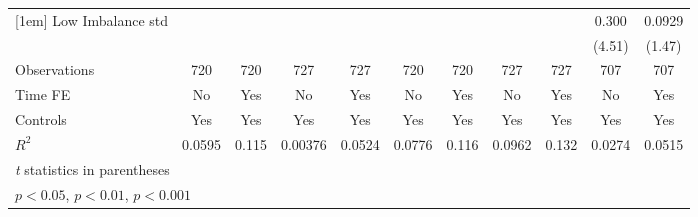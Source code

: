 {\begin{tabular}{l*{10}{c}}
[1em]
Low Imbalance std&                  &                  &                  &                  &                  &                  &                  &                  &    0.300\sym{***}&   0.0929         \\
                &                  &                  &                  &                  &                  &                  &                  &                  &   (4.51)         &   (1.47)         \\
\hline
Observations    &      720         &      720         &      727         &      727         &      720         &      720         &      727         &      727         &      707         &      707         \\
Time FE         &       No         &      Yes         &       No         &      Yes         &       No         &      Yes         &       No         &      Yes         &       No         &      Yes         \\
Controls        &      Yes         &      Yes         &      Yes         &      Yes         &      Yes         &      Yes         &      Yes         &      Yes         &      Yes         &      Yes         \\
$ R^2 $         &   0.0595         &    0.115         &  0.00376         &   0.0524         &   0.0776         &    0.116         &   0.0962         &    0.132         &   0.0274         &   0.0515         \\
\hline\hline
\multicolumn{11}{l}{\footnotesize \textit{t} statistics in parentheses}\\
\multicolumn{11}{l}{\footnotesize \sym{*} \(p<0.05\), \sym{**} \(p<0.01\), \sym{***} \(p<0.001\)}\\
\end{tabular}
}
